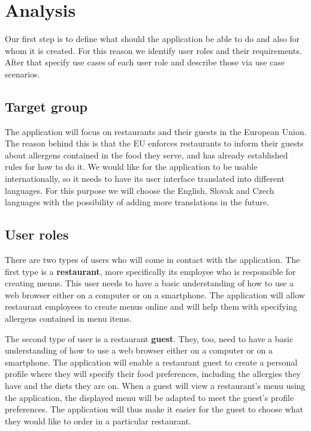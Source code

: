 \chapter{Analysis}
Our first step is to define what should the application be able to do and also for whom it is created.
For this reason we identify user roles and their requirements. 
After that specify use cases of each user role and describe those via use case scenarios.

\section{Target group}
The application will focus on restaurants and their guests in the European Union.
The reason behind this is that the EU enforces restaurants to inform their guests about allergens contained in the food they serve, and has already established rules for how to do it.
We would like for the application to be usable internationally, so it needs to have its user interface translated into different languages.
For this purpose we will choose the English, Slovak and Czech languages with the possibility of adding more translations in the future.


\section{User roles}
There are two types of users who will come in contact with the application.
The first type is a \textbf{restaurant}, more specifically its employee who is responsible for creating menus.
This user needs to have a basic understanding of how to use a web browser either on a computer or on a smartphone.
The application will allow restaurant employees to create menus online and will help them with specifying allergens contained in menu items.

The second type of user is a restaurant \textbf{guest}.
They, too, need to have a basic understanding of how to use a web browser either on a computer or on a smartphone.
The application will enable a restaurant guest to create a personal profile where they will specify their food preferences, including the allergies they have and the diets they are on.
When a guest will view a restaurant's menu using the application, the displayed menu will be adapted to meet the guest's profile preferences.
The application will thus make it easier for the guest to choose what they would like to order in a particular restaurant.

